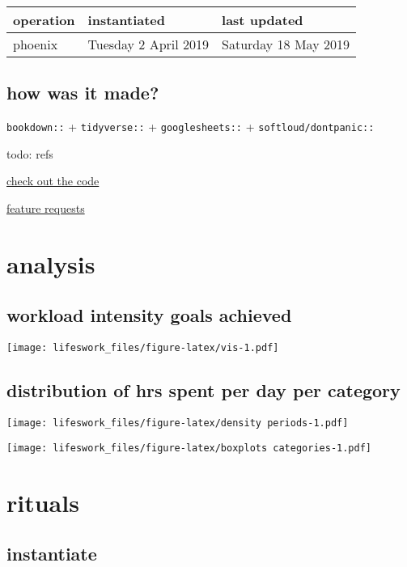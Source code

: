\documentclass[]{book}
\begin{document}
\begin{longtable}[]{@{}lll@{}}
\toprule
operation & instantiated & last updated\tabularnewline
\midrule
\endhead
phoenix & Tuesday 2 April 2019 & Saturday 18 May 2019\tabularnewline
\bottomrule
\end{longtable}

\hypertarget{how-was-it-made}{%
\section{how was it made?}\label{how-was-it-made}}

\texttt{bookdown::} + \texttt{tidyverse::} + \texttt{googlesheets::} + \texttt{softloud/dontpanic::}

todo: refs

\href{https://github.com/softloud/lifeswork}{check out the code}

\href{https://github.com/softloud/lifeswork/issues}{feature requests}

\hypertarget{analysis}{%
\chapter{analysis}\label{analysis}}

\hypertarget{workload-intensity-goals-achieved}{%
\section{workload intensity goals achieved}\label{workload-intensity-goals-achieved}}

\texttt{[image: lifeswork\_files/figure-latex/vis-1.pdf]}

\hypertarget{distribution-of-hrs-spent-per-day-per-category}{%
\section{distribution of hrs spent per day per category}\label{distribution-of-hrs-spent-per-day-per-category}}

\texttt{[image: lifeswork\_files/figure-latex/density periods-1.pdf]}

\texttt{[image: lifeswork\_files/figure-latex/boxplots categories-1.pdf]}

\hypertarget{rituals}{%
\chapter{rituals}\label{rituals}}

\hypertarget{instantiate}{%
\section{instantiate}\label{instantiate}}
\end{document}
